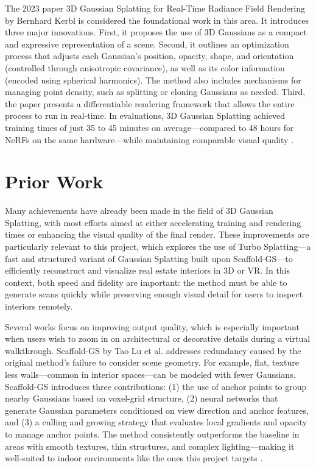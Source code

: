 \documentclass[10pt,twocolumn]{article}
\begin{document}
The 2023 paper 3D Gaussian Splatting for Real-Time Radiance Field Rendering by Bernhard Kerbl \cite{kerbl20233dgaussiansplattingrealtime} is considered the foundational work in this area. It introduces three major innovations. First, it proposes the use of 3D Gaussians as a compact and expressive representation of a scene. Second, it outlines an optimization process that adjusts each Gaussian’s position, opacity, shape, and orientation (controlled through anisotropic covariance), as well as its color information (encoded using spherical harmonics). The method also includes mechanisms for managing point density, such as splitting or cloning Gaussians as needed. Third, the paper presents a differentiable rendering framework that allows the entire process to run in real-time. In evaluations, 3D Gaussian Splatting achieved training times of just 35 to 45 minutes on average—compared to 48 hours for NeRFs on the same hardware—while maintaining comparable visual quality \cite{kerbl20233dgaussiansplattingrealtime}.



\section{Prior Work}
Many achievements have already been made in the field of 3D Gaussian Splatting, with most efforts aimed at either accelerating training and rendering times or enhancing the visual quality of the final render. These improvements are particularly relevant to this project, which explores the use of Turbo Splatting—a fast and structured variant of Gaussian Splatting built upon Scaffold-GS—to efficiently reconstruct and visualize real estate interiors in 3D or VR. In this context, both speed and fidelity are important: the method must be able to generate scans quickly while preserving enough visual detail for users to inspect interiors remotely.

Several works focus on improving output quality, which is especially important when users wish to zoom in on architectural or decorative details during a virtual walkthrough. Scaffold-GS by Tao Lu et al. addresses redundancy caused by the original method’s failure to consider scene geometry. For example, flat, texture less walls—common in interior spaces—can be modeled with fewer Gaussians. Scaffold-GS introduces three contributions: (1) the use of anchor points to group nearby Gaussians based on voxel-grid structure, (2) neural networks that generate Gaussian parameters conditioned on view direction and anchor features, and (3) a culling and growing strategy that evaluates local gradients and opacity to manage anchor points. The method consistently outperforms the baseline in areas with smooth textures, thin structures, and complex lighting—making it well-suited to indoor environments like the ones this project targets \cite{lu2023scaffoldgsstructured3dgaussians}.
\end{document}
